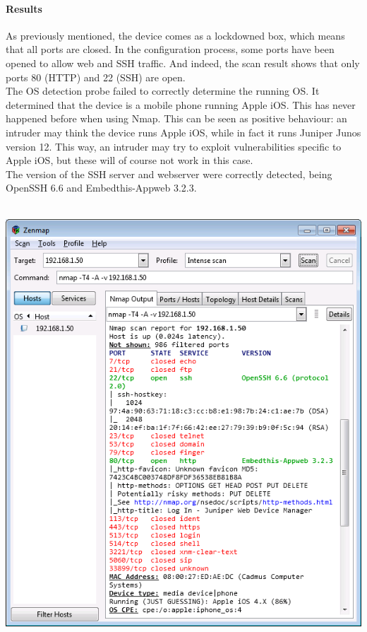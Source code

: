 \documentclass[11pt, a4paper]{article}
\begin{document}
\paragraph{Results} As previously mentioned, the device comes as a lockdowned box, which means that all ports are closed. In the configuration process, some ports have been opened to allow web and SSH traffic. And indeed, the scan result shows that only ports 80 (HTTP) and 22 (SSH) are open. \\
The OS detection probe failed to correctly determine the running OS. It determined that the device is a mobile phone running Apple iOS. This has never happened before when using Nmap. This can be seen as positive behaviour: an intruder may think the device runs Apple iOS, while in fact it runs Juniper Junos version 12. This way, an intruder may try to exploit vulnerabilities specific to Apple iOS, but these will of course not work in this case. \\
The version of  the SSH server and webserver were correctly detected, being OpenSSH 6.6 and Embedthis-Appweb 3.2.3.
$\;$ \\ \\
\noindent\begin{minipage}{\textwidth}
    \centering
    \includegraphics[width=\textwidth]{NMAP_1.png}
\end{minipage}
\end{document}

